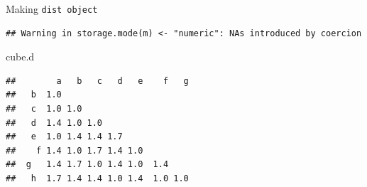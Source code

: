 \documentclass[ignorenonframetext,]{beamer}
\newenvironment{Shaded}{\begin{snugshade}}{\end{snugshade}}
\newcommand{\DecValTok}[1]{\textcolor[rgb]{0.00,0.00,0.81}{#1}}
\newcommand{\KeywordTok}[1]{\textcolor[rgb]{0.13,0.29,0.53}{\textbf{#1}}}
\newcommand{\NormalTok}[1]{#1}
\newcommand{\OperatorTok}[1]{\textcolor[rgb]{0.81,0.36,0.00}{\textbf{#1}}}
\newcommand{\StringTok}[1]{\textcolor[rgb]{0.31,0.60,0.02}{#1}}
\begin{document}
\begin{frame}[fragile]{Making \texttt{dist\ object}}
\protect\hypertarget{making-dist-object}{}

\begin{Shaded}
\end{Shaded}

\begin{verbatim}
## Warning in storage.mode(m) <- "numeric": NAs introduced by coercion
\end{verbatim}

\begin{Shaded}
\begin{Highlighting}[]
\NormalTok{cube.d}
\end{Highlighting}
\end{Shaded}

\begin{verbatim}
##        a   b   c   d   e    f   g
##   b  1.0                         
##   c  1.0 1.0                     
##   d  1.4 1.0 1.0                 
##   e  1.0 1.4 1.4 1.7             
##    f 1.4 1.0 1.7 1.4 1.0         
##  g   1.4 1.7 1.0 1.4 1.0  1.4    
##   h  1.7 1.4 1.4 1.0 1.4  1.0 1.0
\end{verbatim}

\end{frame}
\end{document}
